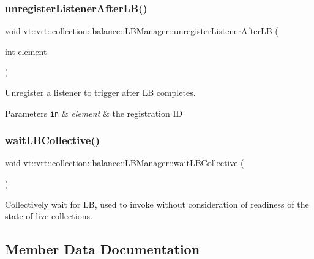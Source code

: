 \subsubsection{\texorpdfstring{unregister\+Listener\+After\+L\+B()}{unregisterListenerAfterLB()}}
{\footnotesize\ttfamily void vt\+::vrt\+::collection\+::balance\+::\+L\+B\+Manager\+::unregister\+Listener\+After\+LB (\begin{DoxyParamCaption}\item[{int}]{element }\end{DoxyParamCaption})}



Unregister a listener to trigger after LB completes. 


\begin{DoxyParams}[1]{Parameters}
\mbox{\tt in}  & {\em element} & the registration ID \\
\hline
\end{DoxyParams}
\mbox{\label{structvt_1_1vrt_1_1collection_1_1balance_1_1_l_b_manager_a2923d77f512a955194589450cbb85b80}} 
\subsubsection{\texorpdfstring{wait\+L\+B\+Collective()}{waitLBCollective()}}
{\footnotesize\ttfamily void vt\+::vrt\+::collection\+::balance\+::\+L\+B\+Manager\+::wait\+L\+B\+Collective (\begin{DoxyParamCaption}{ }\end{DoxyParamCaption})}



Collectively wait for LB, used to invoke without consideration of readiness of the state of live collections. 



\subsection{Member Data Documentation}
\mbox{\label{structvt_1_1vrt_1_1collection_1_1balance_1_1_l_b_manager_ace781095ef59c156a0b23dea6dea70db}} 
